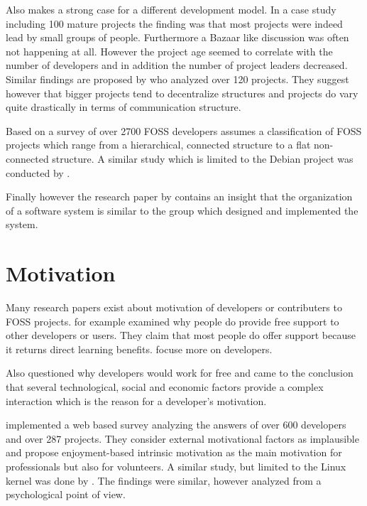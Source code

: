 Also \textcite{Krishnamurthy2002} makes a strong case for a different
development model. In a case study including 100 mature projects the finding
was that most projects were indeed lead by small groups of people. Furthermore
a Bazaar like discussion was often not happening at all. However the project
age seemed to correlate with the number of developers and in addition the
number of project leaders decreased. Similar findings are proposed by
\textcite{Crowston2005a} who analyzed over 120 projects. They suggest however
that bigger projects tend to decentralize structures and projects do vary quite
drastically in terms of communication structure.

Based on a survey of over 2700 \ac{FOSS} developers \textcite{Ghosh2005}
assumes a classification of \ac{FOSS} projects which range from a hierarchical,
connected structure to a flat non-connected structure. A similar study which is
limited to the Debian project was conducted by \textcite{Sadowski2008}.

Finally however the research paper by \textcite{Conway1968} contains an insight
that the organization of a software system is similar to the group which
designed and implemented the system.


\section{Motivation} %

Many research papers exist about motivation of developers or
contributers to \ac{FOSS} projects. \textcite{Lakhani2002} for example
examined why people do provide free support to other developers or users.
They claim that most people do offer support because it returns direct learning
benefits. \textcite{Lerner2000} focuse more on developers.

Also \textcite{Grazzini2009} questioned why developers would work for free and
came to the conclusion that several technological, social and economic factors
provide a complex interaction which is the reason for a developer's motivation.

\textcite{Lakhani2003} implemented a web based survey analyzing the answers of
over 600 developers and over 287 projects. They consider external motivational
factors as implausible and propose enjoyment-based intrinsic motivation as the
main motivation for professionals but also for volunteers. A similar study, but
limited to the Linux kernel was done by \textcite{Hertel2003}. The findings
were similar, however analyzed from a psychological point of view.

